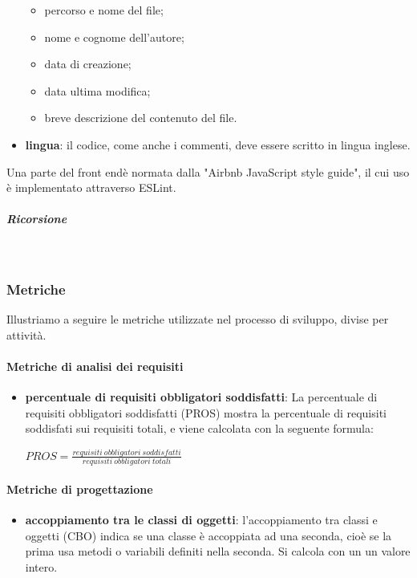 \begin{itemize}
						\begin{itemize}
							\item percorso e nome del file;
							\item nome e cognome dell'autore;
							\item data di creazione;
							\item data ultima modifica;
							\item breve descrizione del contenuto del file.
						\end{itemize}
					\item \textbf{lingua}: il codice, come anche i commenti, deve essere scritto 
						in lingua inglese.
				\end{itemize}
			Una parte del front end\glosp è normata dalla "Airbnb JavaScript style 
			guide", il cui uso è implementato attraverso ESLint\glo. \newline \newline
			\subparagraph*{Ricorsione}  \mbox{}\\
			
			
			
			
	\subsubsection{Metriche}
	Illustriamo a seguire le metriche utilizzate nel processo di sviluppo, divise per attività.
		\paragraph{Metriche di analisi dei requisiti}
		\begin{itemize}
			\item \textbf{percentuale di requisiti obbligatori soddisfatti}:
			La percentuale di requisiti obbligatori soddisfatti (PROS) mostra la percentuale di requisiti soddisfati sui requisiti totali, e viene calcolata con la seguente formula:	
			\begin{center}
				$ PROS = \frac{requisiti\ obbligatori\ soddisfatti}{requisiti\ obbligatori\ totali}$
			\end{center}		
		\end{itemize}		
		\paragraph{Metriche di progettazione}
		\begin{itemize}
			\item \textbf{accoppiamento tra le classi di oggetti}:
			l'accoppiamento tra classi e oggetti (CBO) indica se una classe è accoppiata ad una seconda, cioè se la prima usa metodi o variabili definiti nella seconda. Si calcola con un un valore intero.
		\end{itemize}
